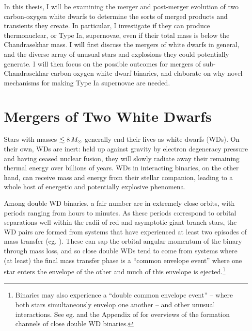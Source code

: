 In this thesis, I will be examining the merger and post-merger evolution of two carbon-oxygen white dwarfs to determine the sorts of merged products and transients they create.  In particular, I investigate if they can produce thermonuclear, or Type Ia, supernovae, even if their total mass is below the Chandrasekhar mass.  I will first discuss the mergers of white dwarfs in general, and the diverse array of unusual stars and explosions they could potentially generate.  I will then focus on the possible outcomes for mergers of sub-Chandrasekhar carbon-oxygen white dwarf binaries, and elaborate on why novel mechanisms for making Type Ia supernovae are needed.


\section{Mergers of Two White Dwarfs}
\label{sec:c1_wdmergers}

Stars with masses $\lesssim8\,\Msun$ generally end their lives as white dwarfs (WDs).  On their own, WDs are inert: held up against gravity by electron degeneracy pressure and having ceased nuclear fusion, they will slowly radiate away their remaining thermal energy over billions of years.  WDs in interacting binaries, on the other hand, can receive mass and energy from their stellar companion, leading to a whole host of energetic and potentially explosive phenomena.


Among double WD binaries, a fair number are in extremely close orbits, with periods ranging from hours to minutes.  As these periods correspond to orbital separations well within the radii of red and asymptotic giant branch stars, the WD pairs are formed from systems that have experienced at least two episodes of mass transfer (eg. \citealt{nele+01a, toonnp12, toon+14}).  These can sap the orbital angular momentum of the binary through mass loss, and so close double WDs tend to come from systems where (at least) the final mass transfer phase is a ``common envelope event'' where one star enters the envelope of the other and much of this envelope is ejected.\footnote{Binaries may also experience a ``double common envelope event'' -- where both stars simultaneously envelop one another -- and other unusual interactions.  See eg. \cite{toonnp12} and the Appendix of \cite{toon+14} for overviews of the formation channels of close double WD binaries.}

